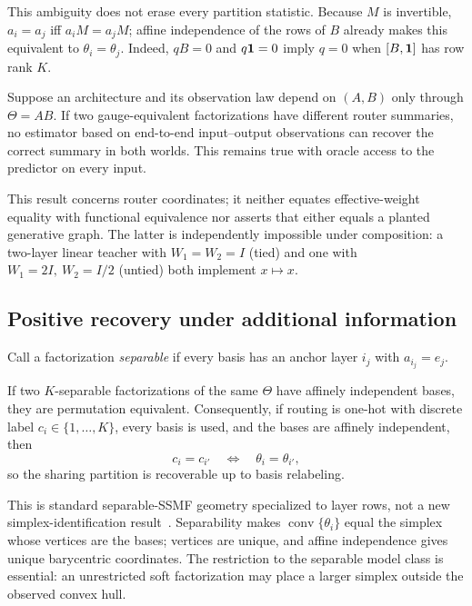 This ambiguity does not erase every partition statistic.  Because $M$ is
invertible, $a_i=a_j$ iff $a_iM=a_jM$; affine independence of the rows of
$B$ already makes this equivalent to $\theta_i=\theta_j$.  Indeed,
$qB=0$ and $q\mathbf{1}=0$ imply $q=0$ when $[B,\mathbf{1}]$ has row rank $K$.

\begin{proposition}
\label{thm:end_to_end_impossibility}
Suppose an architecture and its observation law depend on $(A,B)$ only through
$\Theta=AB$.  If two gauge-equivalent factorizations have different router
summaries, no estimator based on end-to-end input--output observations can
recover the correct summary in both worlds.  This remains true with oracle
access to the predictor on every input.
\end{proposition}

This result concerns router coordinates; it neither equates effective-weight
equality with functional equivalence nor asserts that either equals a planted
generative graph.  The latter is independently impossible under composition:
a two-layer linear teacher with $W_1=W_2=I$ (tied) and one with
$W_1=2I,\ W_2=I/2$ (untied) both implement $x\mapsto x$.

\subsection{Positive recovery under additional information}

Call a factorization \emph{separable} if every basis has an anchor layer
$i_j$ with $a_{i_j}=e_j$.

\begin{proposition}
\label{thm:anchor_recovery}
If two $K$-separable factorizations of the same $\Theta$ have affinely
independent bases, they are permutation equivalent.  Consequently, if routing
is one-hot with discrete label $c_i\in\{1,\ldots,K\}$, every basis is used,
and the bases are affinely independent, then
\begin{equation}
 c_i=c_{i'}\quad\Longleftrightarrow\quad\theta_i=\theta_{i'},
 \label{eq:onehot_partition}
\end{equation}
so the sharing partition is recoverable up to basis relabeling.
\end{proposition}

This is standard separable-SSMF geometry specialized to layer rows, not a new
simplex-identification result~\citep{abdolali2021simplex}.  Separability makes
$\operatorname{conv}\{\theta_i\}$ equal the simplex whose vertices are the
bases; vertices are unique, and affine independence gives unique barycentric
coordinates.  The restriction to the separable model class is essential: an
unrestricted soft factorization may place a larger simplex outside the
observed convex hull.

